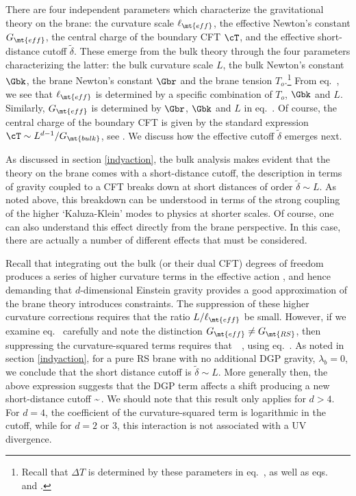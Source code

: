 There are four independent parameters which characterize the gravitational theory on the brane: the curvature scale $\ell_\mt{eff}$, the effective Newton's constant $G_\mt{eff}$, the central charge of the boundary CFT $\cT$, and the effective short-distance cutoff $\tilde\delta$. These emerge from the bulk theory through the four parameters characterizing the latter: the bulk curvature scale $L$, the bulk Newton's constant $\Gbk$, the brane Newton's constant $\Gbr$ and the brane tension $T_o$.\footnote{Recall that $\Delta T$ is determined by these parameters in eq.~, as well as eqs.~ and .} From eq.~, we see that $\ell_\mt{eff}$ is determined by a specific combination of $T_o$, $\Gbk$ and $L$. Similarly, $G_\mt{eff}$ is determined by $\Gbr$, $\Gbk$ and $L$ in eq.~. Of course, the central charge of the boundary CFT is given by the standard expression $\cT\sim L^{d-1}/G_\mt{bulk}$, \eg see \cite{Buchel:2009sk}. We discuss how the effective cutoff $\tilde\delta$ emerges next.

As discussed in section \ref{indyaction}, the bulk analysis makes evident that the theory on the brane comes with a short-distance cutoff, \ie the description in terms of gravity coupled to a CFT breaks down at short distances of order $\tilde\delta\sim L$. As noted above,  this breakdown can be understood in terms of the strong coupling of the higher `Kaluza-Klein' modes to physics at shorter scales. Of course, one can also understand this effect directly from the brane perspective. In this case, there are actually a number of different effects that must be considered. 

Recall that integrating out the bulk (or their dual CFT) degrees of freedom produces a series of higher curvature terms in the effective action , and hence demanding that $d$-dimensional Einstein gravity provides a good approximation of the brane theory introduces constraints. The suppression of these higher curvature corrections requires that the ratio $L/\ell_\mt{eff}$ be small. However, if we examine eq.~ carefully and note the distinction $G_\mt{eff}\ne G_\mt{RS}$, then suppressing the curvature-squared terms requires that
\beq
{}\,
\,,
\label{lmfao}
\eeq
using eq.~.  As noted in section \ref{indyaction}, for a pure RS brane with no additional DGP gravity, \ie $\lambda_b=0$, we conclude that the short distance cutoff is $\tilde\delta\sim L$. More generally then, the above expression suggests that the DGP term  affects a shift producing a new short-distance cutoff 
\beq
\tilde\delta\sim {}\,.
\label{haiku}
\eeq
We should note that this result only applies for $d>4$. For $d=4$, the coefficient of the curvature-squared term is logarithmic in the cutoff, while for $d=2$ or 3, this interaction is not associated with a UV divergence.

